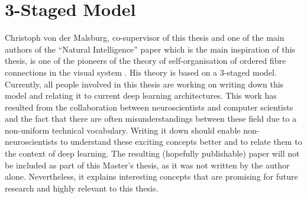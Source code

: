 \section{3-Staged Model}
Christoph von der Malsburg, co-supervisor of this thesis and one of the main authors of the ``Natural Intelligence'' paper  which is the main inspiration of this thesis, is one of the pioneers of the theory of self-organisation of ordered fibre connections in the visual system . His theory is based on a $3$-staged model. Currently, all people involved in this thesis are working on writing down this model and relating it to current deep learning architectures. This work has resulted from the collaboration between neuroscientists and computer scientists and the fact that there are often misunderstandings between these field due to a non-uniform technical vocabulary. Writing it down should enable non-neuroscientists to understand these exciting concepts better and to relate them to the context of deep learning. The resulting (hopefully publishable) paper will not be included as part of this Master's thesis, as it was not written by the author alone. Nevertheless, it explains interesting concepts that are promising for future research and highly relevant to this thesis.

